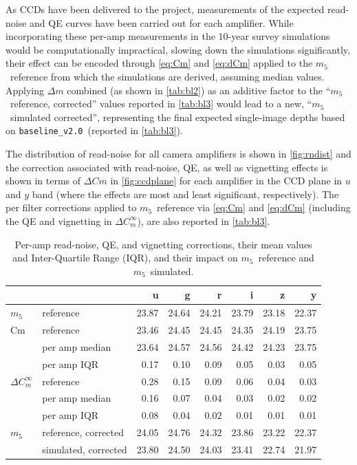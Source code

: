 \documentclass[PST,authoryear,toc]{lsstdoc}
\newcommand{\mf}{\ensuremath{m_5}}
\newcommand{\baseline}{\texttt{baseline\_v2.0}}
\begin{document}
As CCDs have been delivered to the project, measurements of the expected read-noise and QE curves have been carried out for each amplifier. While incorporating these per-amp measurements in the 10-year survey simulations would be computationally impractical, slowing down the simulations significantly, their effect can be encoded through \autoref{eq:Cm} and \autoref{eq:dCm} applied to the \mf\ reference from which the simulations are derived, assuming median values. Applying $\Delta m$ combined (as shown in \autoref{tab:bl2}) as an additive factor to the ``\mf\ reference, corrected'' values reported in \autoref{tab:bl3} would lead to a new,  ``\mf\ simulated corrected'', representing the final expected single-image depths based on \baseline\ (reported in \autoref{tab:bl3}).

The distribution of read-noise for all camera amplifiers is shown in \autoref{fig:rndist} and the correction associated with read-noise, QE, as well as vignetting effects is shown in terms of $\Delta Cm$ in \autoref{fig:ccdplane} for each amplifier in the CCD plane in $u$ and $y$ band (where the effects are most and least significant, respectively).
The per filter corrections applied to \mf\ reference via \autoref{eq:Cm} and \autoref{eq:dCm} (including the QE and vignetting in $\Delta C_m^\infty$), are also reported in \autoref{tab:bl3}.

\FloatBarrier

\begin{table}\caption{Per-amp read-noise, QE, and vignetting corrections, their mean values and Inter-Quartile Range (IQR), and their impact on \mf\ reference and \mf\ simulated.}\label{tab:bl3}
    \centering
 \begin{tabular}{llrrrrrr}
 \hline
 {} & &             u &      g &  r &   i &     z &      y \\
 \hline
 \mf & reference &    23.87  &  24.64 & 24.21 &  23.79 & 23.18 &  22.37\\
 \hline
  \hline
Cm & reference &  23.46 &  24.45 & 24.45 &  24.35 &   24.19 &  23.75 \\
 &per amp median &   23.64 &  24.57 & 24.56 &24.42 &    24.23 &  23.75 \\
 &per amp IQR          &    0.17 &   0.10 & 0.09 &    0.05 &   0.03 &   0.05 \\
  \hline
  $\Delta C_m^\infty$& reference       &     0.28&   0.15 &  0.09 &  0.06 &   0.04  &   0.03 \\
 &per amp median        &        0.16  &   0.07 &  0.04 & 0.03 & 0.02&   0.02 \\
 &per amp IQR     &       0.08  &   0.04 &  0.02 &  0.01 & 0.01 &   0.01\\
 \hline
  \hline
\mf &reference, corrected              &     24.05 &  24.76 &  24.32 & 23.86 & 23.22 &  22.37 \\
&simulated, corrected              &     23.80 &  24.50 & 24.03 & 23.41& 22.74 & 21.97\\
  \hline
 \end{tabular}
\end{table}
\FloatBarrier
\clearpage
\end{document}
